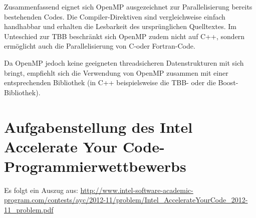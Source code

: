\documentclass[11pt]{scrartcl}
\begin{document}
Zusammenfassend eignet sich OpenMP ausgezeichnet zur Parallelisierung bereits besteh\-enden Codes. Die Compiler-Direktiven sind vergleichweise einfach handhabbar und erhalten die Lesbarkeit des ursprünglichen Quelltextes. Im Unteschied zur TBB beschränkt sich OpenMP zudem nicht auf C++, sondern ermöglicht auch die Parallelisierung von C-oder Fortran-Code.

Da OpenMP jedoch keine geeigneten threadsicheren Datenstrukturen mit sich bringt, empfiehlt sich die Verwendung von OpenMP zusammen mit einer entsprechenden Bibliothek (in C++ beispielsweise die TBB- oder die Boost-Bibliothek).

\pagebreak %

\fancyhead[R]{}

\thispagestyle{empty}

\renewcommand*{\biburlprefix}{(URL: }
\renewcommand*{\biburlsuffix}{)}

\pagebreak
{} %


\appendix

\section{Aufgabenstellung des Intel Accelerate Your Code-Programmierwettbewerbs}

\label{intel_ayc_problem}

Es folgt ein Auszug aus:
\url{http://www.intel-software-academic-program.com/contests/ayc/2012-11/problem/Intel_AccelerateYourCode_2012-11_problem.pdf}
\end{document}
